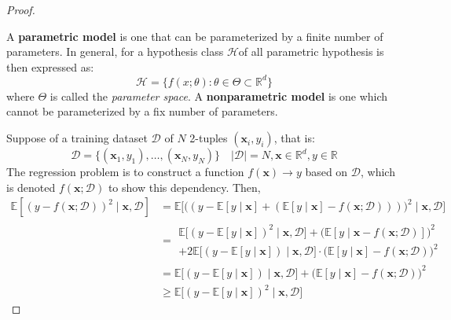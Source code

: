 \documentclass[10pt]{article}
\begin{document}
\begin{proof}
    \begin{definition}[Parameterization]
        A \textbf{parametric model} is one that can be parameterized by a finite number of parameters. In general, for a hypothesis class $\mathcal{H}$of all parametric hypothesis is then expressed as:
        \begin{equation}
            \mathcal{H} = \{f(x;\theta): \theta \in \Theta \subset \mathbb{R}^{d}\}
        \end{equation} where $\Theta$ is called the \textit{parameter space}. A \textbf{nonparametric model} is one which cannot be parameterized by a fix number of parameters.   
    \end{definition}
    Suppose of a training dataset $\mathcal{D}$ of $N$ 2-tuples $(\mathbf{x}_{i},y_{i})$, that is: \begin{equation}
        \mathcal{D} = \{(\mathbf{x}_{1},y_{1}),\dots,(\mathbf{x}_{N},y_{N})\} \quad \lvert \mathcal{D} \rvert = N, \mathbf{x}\in \mathbb{R}^{d}, y \in \mathbb{R}
    \end{equation}
    The regression problem is to construct a function $f(\mathbf{x})\to y$ based on $\mathcal{D}$, which is denoted $f(\mathbf{x};\mathcal{D})$ to show this dependency. Then, 
    \begin{equation}
        \begin{split}
            \mathbb{E}\left[ (y-f(\mathbf{x};\mathcal{D}))^{2}\mid \mathbf{x},\mathcal{D}\right] & = \mathbb{E}\Big[\big( (y-\mathbb{E}[y\mid \mathbf{x}]+ (\mathbb{E}[y\mid \mathbf{x}]-f(\mathbf{x};\mathcal{D}))) \big)^{2}\mid \mathbf{x},\mathcal{D}\Big]\\
            & = \begin{multlined}
                \mathbb{E} \Big[ (y- \mathbb{E}[y\mid \mathbf{x}])^{2}\mid \mathbf{x},\mathcal{D} \Big] + \Big(\mathbb{E}[y\mid \mathbf{x}-f(\mathbf{x};\mathcal{D})]\Big)^{2} \\ + 2\mathbb{E} \big[(y-\mathbb{E}[y\mid \mathbf{x}])\mid \mathbf{x},\mathcal{D}\big]\cdot \big(\mathbb{E}[y\mid \mathbf{x}]-f(\mathbf{x;\mathcal{D}})\big)^{2} 
            \end{multlined} \\
            & = \mathbb{E} \Big[(y-\mathbb{E}[y\mid \mathbf{x}])\mid \mathbf{x},\mathcal{D}\Big] + \big(\mathbb{E}[y\mid \mathbf{x}]-f(\mathbf{x};\mathcal{D})\big)^{2}\\
            & \geq \mathbb{E} \big[(y-\mathbb{E}[y\mid \mathbf{x}])^{2}\mid \mathbf{x},\mathcal{D}\big]
        \end{split}

\end{equation}
\end{proof}
\end{document}
